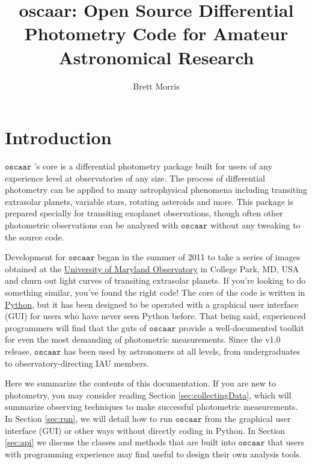\documentclass{article}
\begin{document}
\title{\textbf{oscaar}: Open Source Differential Photometry Code for Amateur Astronomical Research}
\author{Brett Morris}
\maketitle
\tableofcontents
\section{Introduction}

\newcommand{\oscaar}{$ \mathtt{oscaar}$ }
\newcommand{\code}[1]{\texttt{#1}}
\newcommand{\init}{\code{init.par}\ }

\oscaar's core is a differential photometry package built for users of any experience level at observatories of any size. The process of differential photometry can be applied to many astrophysical phenomena including transiting extrasolar planets, variable stars, rotating asteroids and more. This package is prepared specially for transiting exoplanet observations, though often other photometric observations can be analyzed with \oscaar without any tweaking to the source code.

Development for \oscaar began in the summer of 2011 to take a series of images obtained at the \href{http://www.astro.umd.edu/openhouse/}{University of Maryland Observatory} in College Park, MD, USA and churn out light curves of transiting extrasolar planets. If you're looking to do something similar, you've found the right code! The core of the code is written in \href{http://www.python.org/}{Python}, but it has been designed to be operated with a graphical user interface (GUI) for users who have never seen Python before. That being said, experienced programmers will find that the guts of \oscaar provide a well-documented toolkit for even the most demanding of photometric measurements. Since the v1.0 release, \oscaar has been used by astronomers at all levels, from undergraduates to observatory-directing IAU members.

Here we summarize the contents of this documentation. If you are new to photometry, you may consider reading Section \ref{sec:collectingData}, which will summarize observing techniques to make successful photometric measurements. In Section \ref{sec:run}, we will detail how to run \oscaar from the graphical user interface (GUI) or other ways without directly coding in Python. In Section \ref{sec:api} we discuss the classes and methods that are built into \oscaar that users with programming experience may find useful to design their own analysis tools. 
\end{document}
